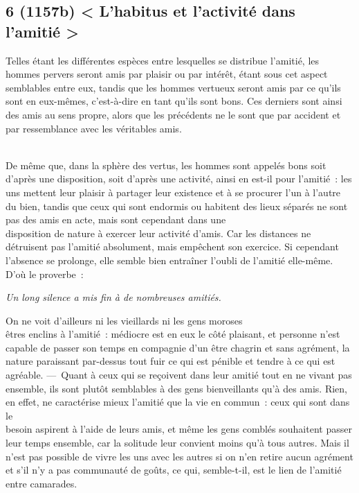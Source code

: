 \documentclass[french,twoside]{book} %
\begin{document}
\subsection[{6 (1157b) < L’habitus et l’activité dans l’amitié >}]{6 (1157b) < L’habitus et l’activité dans l’amitié >}
\noindent  Telles étant les différentes espèces entre lesquelles se distribue l’amitié, les hommes pervers seront amis par plaisir ou par intérêt, étant sous cet aspect semblables entre eux, tandis que les hommes vertueux seront amis par ce qu’ils sont en eux-mêmes, c’est-à-dire en tant qu’ils sont bons. Ces derniers sont ainsi des amis au sens propre, alors que les précédents ne le sont que par accident et par ressemblance avec les véritables amis.\par
\\
De même que, dans la sphère des vertus, les hommes sont appelés bons soit d’après une disposition, soit d’après une activité, ainsi en est-il pour l’amitié : les uns mettent leur plaisir à partager leur existence et à se procurer l’un à l’autre du bien, tandis que ceux qui sont endormis ou habitent des lieux séparés ne sont pas des amis en acte, mais sont cependant dans une \\
disposition de nature à exercer leur activité d’amis. Car les distances ne détruisent pas l’amitié absolument, mais empêchent son exercice. Si cependant l’absence se prolonge, elle semble bien entraîner l’oubli de l’amitié elle-même. D’où le proverbe :\par
 {\itshape Un long silence a mis fin à de nombreuses amitiés.} \par
On ne voit d’ailleurs ni les vieillards ni les gens moroses \\
êtres enclins à l’amitié : médiocre est en eux le côté plaisant, et personne n’est capable de passer son temps en compagnie d’un être chagrin et sans agrément, la nature paraissant par-dessus tout fuir ce qui est pénible et tendre à ce qui est agréable. — Quant à ceux qui se reçoivent dans leur amitié tout en ne vivant pas ensemble, ils sont plutôt semblables à des gens bienveillants qu’à des amis. Rien, en effet, ne caractérise mieux l’amitié que la vie en commun : ceux qui sont dans le \\
besoin aspirent à l’aide de leurs amis, et même les gens comblés souhaitent passer leur temps ensemble, car la solitude leur convient moins qu’à tous autres. Mais il n’est pas possible de vivre les uns avec les autres si on n’en retire aucun agrément et s’il n’y a pas communauté de goûts, ce qui, semble-t-il, est le lien de l’amitié entre camarades.
\end{document}
